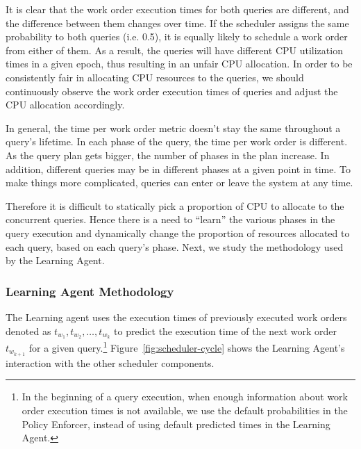 It is clear that the work order execution times for both queries are different, and the difference between them changes over time. 
If the scheduler assigns the same probability to both queries (i.e. 0.5), it is equally likely to schedule a work order from either of them. 
As a result, the queries will have different CPU utilization times in a given epoch, thus resulting in an unfair CPU allocation. 
In order to be consistently fair in allocating CPU resources to the queries, we should continuously observe the work order execution times of queries and adjust the CPU allocation accordingly. %

In general, the time per work order metric doesn't stay the same throughout a query's lifetime.
In each phase of the query, the time per work order is different.
As the query plan gets bigger, the number of phases in the plan increase.
In addition, different queries may be in different phases at a given point in time.
To make things more complicated, queries can enter or leave the system at any time.


Therefore it is difficult to statically pick a proportion of CPU to allocate to the concurrent queries. 
Hence there is a need to ``learn'' the various phases in the query execution and dynamically change the proportion of resources allocated to each query, based on each query's phase.
Next, we study the methodology used by the Learning Agent.
\subsubsection{Learning Agent Methodology}
The Learning agent uses the execution times of previously executed work orders 
denoted as $t_{w_{1}}, t_{w_{2}}, \ldots, t_{w_{k}}$ to predict the execution time of 
the next work order $t_{w_{k+1}}$ for a given query.\footnote{In the beginning of a query execution, when enough information about work order execution times is not available, we use the default probabilities in the Policy Enforcer, instead of using default predicted times in the Learning Agent.}
Figure~\ref{fig:scheduler-cycle} shows the Learning Agent's interaction with the other scheduler components.

